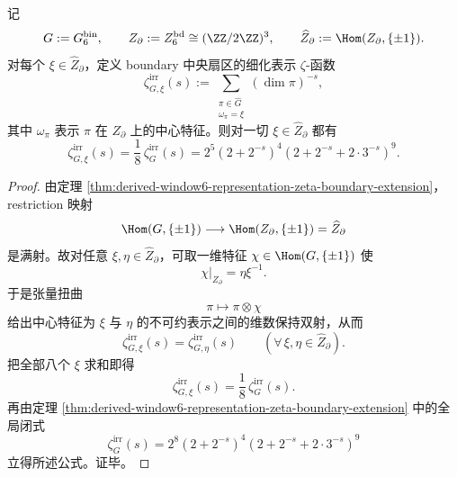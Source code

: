 \begin{theorem}\label{thm:conclusion-window6-boundary-conductor-two-zeta-flatness}
记
\[
G:=G_6^{\mathrm{bin}},
\qquad
Z_{\partial}:=Z_6^{\mathrm{bd}}\cong (\ZZ/2\ZZ)^3,
\qquad
\widehat Z_{\partial}:=\Hom(Z_{\partial},\{\pm1\}).
\]
对每个 \(\xi\in \widehat Z_{\partial}\)，定义 boundary 中央扇区的细化表示 \(\zeta\)-函数
\[
\zeta^{\mathrm{irr}}_{G,\xi}(s)
:=
\sum_{\substack{\pi\in \widehat G\\ \omega_\pi=\xi}}
(\dim \pi)^{-s},
\]
其中 \(\omega_\pi\) 表示 \(\pi\) 在 \(Z_{\partial}\) 上的中心特征。则对一切 \(\xi\in\widehat Z_{\partial}\) 都有
\[
\zeta^{\mathrm{irr}}_{G,\xi}(s)
=
\frac18\,\zeta^{\mathrm{irr}}_{G}(s)
=
2^5(2+2^{-s})^4(2+2^{-s}+2\cdot 3^{-s})^9.
\]
\end{theorem}
\begin{proof}
由定理 \ref{thm:derived-window6-representation-zeta-boundary-extension}，restriction 映射
\[
\Hom(G,\{\pm1\})\longrightarrow \Hom(Z_{\partial},\{\pm1\})=\widehat Z_{\partial}
\]
是满射。故对任意 \(\xi,\eta\in \widehat Z_{\partial}\)，可取一维特征 \(\chi\in \Hom(G,\{\pm1\})\) 使
\[
\chi|_{Z_{\partial}}=\eta\xi^{-1}.
\]
于是张量扭曲
\[
\pi\longmapsto \pi\otimes \chi
\]
给出中心特征为 \(\xi\) 与 \(\eta\) 的不可约表示之间的维数保持双射，从而
\[
\zeta^{\mathrm{irr}}_{G,\xi}(s)=\zeta^{\mathrm{irr}}_{G,\eta}(s)
\qquad
(\forall\,\xi,\eta\in\widehat Z_{\partial}).
\]
把全部八个 \(\xi\) 求和即得
\[
\zeta^{\mathrm{irr}}_{G,\xi}(s)=\frac18\,\zeta^{\mathrm{irr}}_{G}(s).
\]
再由定理 \ref{thm:derived-window6-representation-zeta-boundary-extension} 中的全局闭式
\[
\zeta^{\mathrm{irr}}_{G}(s)
=
2^8(2+2^{-s})^4(2+2^{-s}+2\cdot 3^{-s})^9
\]
立得所述公式。证毕。
\end{proof}

